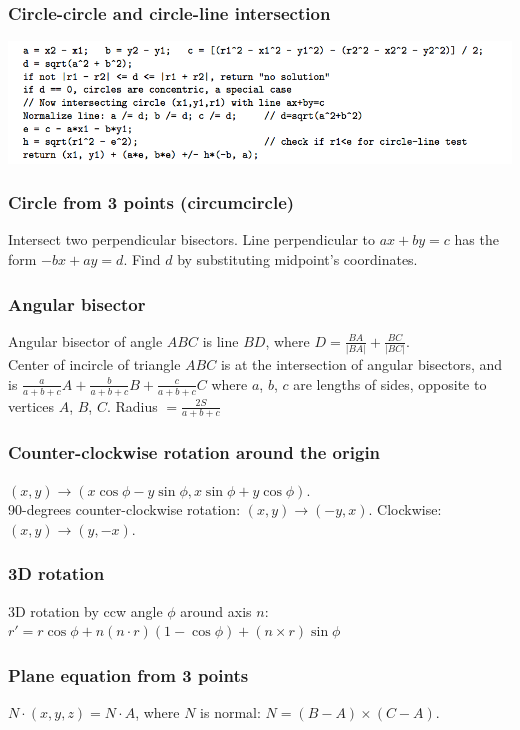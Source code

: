 \documentclass[a4paper,12pt]{article}
\begin{document}
\subsubsection{Circle-circle and circle-line intersection}
 \includegraphics[scale=.7]{geometry/candc.png}

\subsubsection{Circle from 3 points (circumcircle)}
Intersect two perpendicular bisectors. Line perpendicular to $ax + by = c$ has the form $-bx + ay = d$. Find $d$ by substituting midpoint’s coordinates.

\subsubsection{Angular bisector}
Angular bisector of angle $ABC$ is line $BD$, where $D = \frac{BA}{|BA|} + \frac{BC}{|BC|}$.\\
Center of incircle of triangle $ABC$ is at the intersection of angular bisectors, and is $\frac{a}{a+b+c}A + \frac{b}{a+b+c}B + \frac{c}{a+b+c}C$
where $a$, $b$, $c$ are lengths of sides, opposite to vertices $A$, $B$, $C$. Radius $= \frac{2S}{a+b+c}$

\subsubsection{Counter-clockwise rotation around the origin}
$(x,y) \rightarrow (x\cos\phi - y\sin\phi, x \sin\phi + y \cos\phi)$.\\
90-degrees counter-clockwise rotation: $(x,y) \rightarrow (-y,x)$. Clockwise: $(x,y) \rightarrow (y,-x)$.

\subsubsection{3D rotation}
3D rotation by ccw angle $\phi$ around axis $n$: $r' = r \cos\phi + n(n \cdot r)(1 - \cos \phi) + (n \times r) \sin\phi$

\subsubsection{Plane equation from 3 points}
$N \cdot (x, y, z) = N \cdot A$, where $N$ is normal: $N = (B - A) \times (C - A)$.
\end{document}

